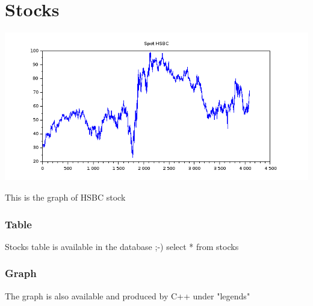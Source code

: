 \documentclass[8pt]{article} %
\begin{document}
\section{Stocks}
\includegraphics[scale=0.6]{Scilab-stocks.png}

This is the graph of HSBC stock 

\subsubsection{Table}
Stocks table is available in the database ;-)
select * from stocks
%
\subsubsection{Graph}
The graph is also available and produced by C++ under "legends"


%
\end{document}

